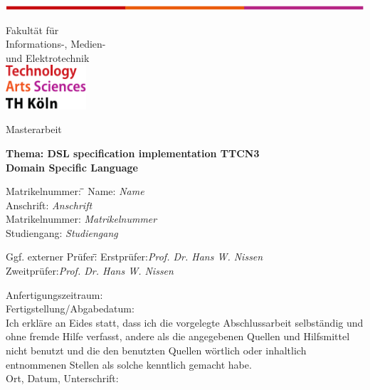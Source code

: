 \begin{titlepage}
\vspace*{-20ex}
\includegraphics[width=\textwidth]{grafiken/Linie}\\[2ex]
{\sffamily 
Fakult\"at f\"ur\\
Informations-, Medien-\\
und Elektrotechnik\\[10ex]
\includegraphics[width=3cm]{grafiken/thk}\\
\begin{center}
 \Huge  Masterarbeit\\[4ex]
\end{center}
\Large
\textbf{Thema: DSL specification implementation TTCN3 \\ Domain Specific Language}
\large 
\begin{tabbing}
Matrikelnummer: \hspace*{2ex}\= \=\kill
Name: \> \textit{Name}\\
Anschrift:\> \textit{Anschrift}\\
Matrikelnummer:\> \textit{Matrikelnummer}	\\	
Studiengang:\> \textit{Studiengang}\\
\end{tabbing}
\begin{tabbing}
Ggf. externer Prüfer:\hspace*{2ex}\= \=\kill
Erstpr\"ufer:\>\textit{Prof. Dr. Hans W. Nissen}\\			
Zweitpr\"ufer:\>\textit{Prof. Dr. Hans W. Nissen}\\
\end{tabbing}
Anfertigungszeitraum:\\
Fertigstellung/Abgabedatum:\\[5ex]
%
Ich erkl\"are an Eides statt, dass ich die vorgelegte Abschlussarbeit selbst\"andig 
und ohne fremde Hilfe verfasst, andere als die angegebenen Quellen und 
Hilfsmittel nicht benutzt und die den benutzten Quellen w\"ortlich oder inhaltlich 
entnommenen Stellen als solche kenntlich gemacht habe.\\[6ex]
%
Ort, Datum, Unterschrift: \hrulefill
}
\normalsize
\end{titlepage}

